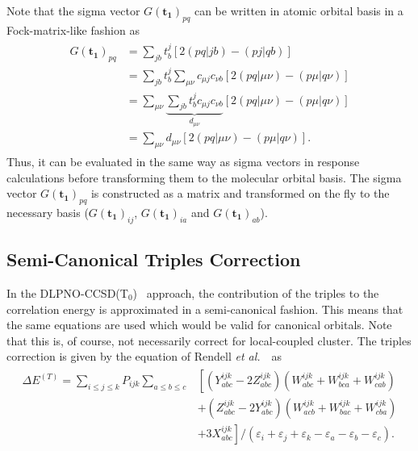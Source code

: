 Note that the sigma vector $G(\pmb{t_1})_{pq}$ can be written in atomic orbital basis in a Fock-matrix-like fashion
as
\begin{align}
  \begin{split}
    G(\pmb{t_1})_{pq} &= \sum_{jb} t_b^j \left[2(pq|jb)-(pj|qb)\right]\\
                      &= \sum_{jb} t_b^j \sum_{\mu\nu} c_{\mu j} c_{\nu b} \left[ 2(pq|\mu\nu)-(p\mu|q\nu) \right]\\
                      &= \sum_{\mu\nu} \underbrace{\sum_{jb} t_b^j c_{\mu j} c_{\nu b}}_{d_{\mu\nu}}
                         \left[ 2(pq|\mu\nu)-(p\mu|q\nu) \right]\\
                      &= \sum_{\mu\nu} d_{\mu\nu} \left[ 2(pq|\mu\nu)-(p\mu|q\nu) \right].
  \end{split}
  \label{eq:SigmaVectorAO}
\end{align}
Thus, it can be evaluated in the same way as sigma vectors in response calculations before transforming them to
the molecular orbital basis. The sigma vector $G(\pmb{t_1})_{pq}$ is constructed as a matrix and transformed on
the fly to the necessary basis ($G(\pmb{t_1})_{ij}$, $G(\pmb{t_1})_{ia}$ and $G(\pmb{t_1})_{ab}$).

\subsection{Semi-Canonical Triples Correction}
In the DLPNO-CCSD(T$_0$)~\cite{Riplinger2013a} approach, the contribution of the triples
to the correlation energy is approximated in a semi-canonical fashion. This means that the same equations
are used which would be valid for canonical orbitals. Note that this is, of course, not necessarily correct for
local-coupled cluster. The triples correction is given by the equation of Rendell
\emph{et al.}~\cite{Rendell1991}\ as
\begin{align}
  \begin{split}
    \Delta E^{(T)} = \sum_{i\leq j\leq k} P_{ijk} \sum_{a\leq b\leq c }&
      \left[ (Y_{abc}^{ijk}-2Z_{abc}^{ijk})(W_{abc}^{ijk}+W_{bca}^{ijk}+W_{cab}^{ijk}) \right. \\
     &+ (Z_{abc}^{ijk}-2Y_{abc}^{ijk})({W_{acb}^{ijk}}+W_{bac}^{ijk}+W_{cba}^{ijk}) \\
     &+ \left. 3X_{abc}^{ijk}\right]
     /(\varepsilon_i+\varepsilon_j+\varepsilon_k-\varepsilon_a-\varepsilon_b-\varepsilon_c).
  \end{split}
\end{align}

